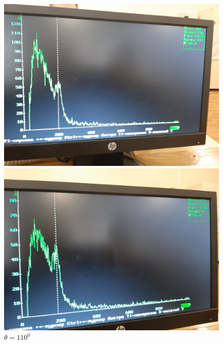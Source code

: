 \documentclass[a4paper, 12pt]{article}
\begin{document}
\begin{figure}[h]
\begin{minipage}[h]{0.3\linewidth}
\includegraphics[width = 1\linewidth]{100.jpg}
\caption{$\theta = 100^0$}
\end{minipage}
\hfill
\begin{minipage}[h]{0.3\linewidth}
\includegraphics[width = 1\linewidth]{110.jpg}
\caption{$\theta = 110^0$}
\end{minipage}
\hfill
\begin{minipage}[h]{0.3\linewidth}

\end{minipage}
\end{figure}
\end{document}
